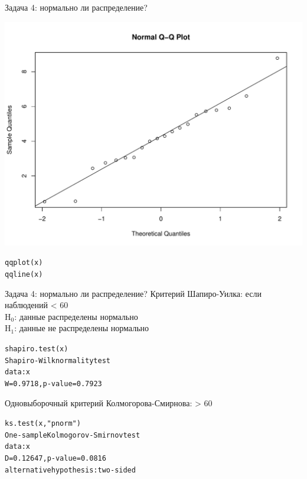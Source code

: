 \begin{frame}{Задача 4: нормально ли распределение?}
\begin{center}
\vspace{-4mm}
\includegraphics[width=0.85\linewidth]{qqplot.pdf}
\end{center}
\scriptsize
\vfill
\begin{alltt}
qqplot(x)\\
qqline(x)
\end{alltt}
\normalsize
\end{frame}
\begin{frame}{Задача 4: нормально ли распределение?}
Критерий Шапиро-Уилка: \hfill если наблюдений < 60\\
H$_0$: данные распределены нормально\\
H$_1$: данные не распределены нормально
\scriptsize
\begin{alltt}
\alert{shapiro.test(x)}\medskip\\
Shapiro-Wilk normality test\\
data:  x\\
\alert{W = 0.9718, p-value = 0.7923}
\end{alltt}
\normalsize
\vfill
Одновыборочный критерий Колмогорова-Смирнова: \hfill > 60\\
\scriptsize
\begin{alltt}
\alert{ks.test(x, "pnorm")}\medskip\\
One-sample Kolmogorov-Smirnov test\\
data:  x\\
\alert{D = 0.12647, p-value = 0.0816}\\
alternative hypothesis: two-sided
\end{alltt}
\normalsize
\end{frame}

